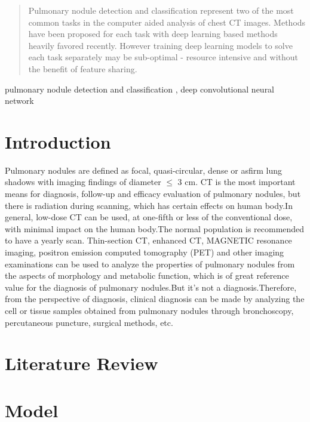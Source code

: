 \documentclass[conference]{IEEEtran}
\begin{document}
\maketitle
\begin{CJK}{UTF8}{gbsn}
\begin{abstract}
    Pulmonary nodule detection and
    classification represent two of the most common tasks in the computer
    aided analysis of chest CT images. Methods have been proposed for each
    task with deep learning based methods heavily favored recently.
    However training deep learning models to solve each task separately may be
    sub-optimal - resource intensive and without the benefit of feature sharing. 
\end{abstract}

\begin{IEEEkeywords}
    pulmonary nodule detection and classification
    , deep convolutional neural network
\end{IEEEkeywords}

\section{Introduction}
Pulmonary nodules are defined as focal, quasi-circular, dense or asfirm lung shadows with imaging findings of diameter $\leq$ 3 cm. \cite{.2019}
CT is the most important means for diagnosis, follow-up and efficacy evaluation of pulmonary nodules, but there is radiation during scanning, which has certain effects on human body.In general, low-dose CT can be used, at one-fifth or less of the conventional dose, with minimal impact on the human body.The normal population is recommended to have a yearly scan.
Thin-section CT, enhanced CT, MAGNETIC resonance imaging, positron emission computed tomography (PET) and other imaging examinations can be used to analyze the properties of pulmonary nodules from the aspects of morphology and metabolic function, which is of great reference value for the diagnosis of pulmonary nodules.But it's not a diagnosis.Therefore, from the perspective of diagnosis, clinical diagnosis can be made by analyzing the cell or tissue samples obtained from pulmonary nodules through bronchoscopy, percutaneous puncture, surgical methods, etc.
\section{Literature Review}



\section{Model}

\end{CJK}
\end{document}

